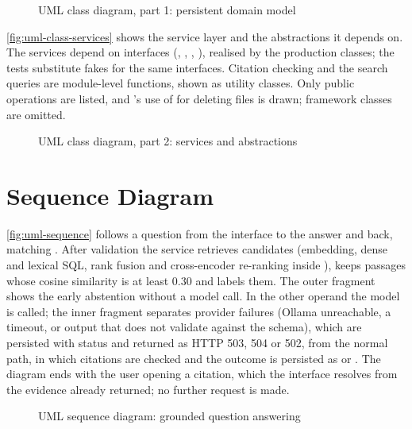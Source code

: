 \begin{figure}[htbp]
  \centering
  \caption{UML class diagram, part 1: persistent domain model}\label{fig:uml-class-domain}
\end{figure}

\autoref{fig:uml-class-services} shows the service layer and the abstractions it depends on. The services depend on
interfaces (, , , ), realised by the
production classes; the tests substitute fakes for the same interfaces. Citation checking and the search queries
are module-level functions, shown as \guillemotleft utility\guillemotright{} classes. Only public operations are listed,
and 's use of  for deleting files is drawn; framework classes are omitted.

\begin{figure}
  \centering
  \caption{UML class diagram, part 2: services and abstractions}\label{fig:uml-class-services}
\end{figure}

\section{Sequence Diagram}

\autoref{fig:uml-sequence} follows a question from the interface to the answer and back, matching
. After validation the service retrieves candidates (embedding, dense and lexical SQL, rank
fusion and cross-encoder re-ranking inside ), keeps passages whose cosine similarity is at least
0.30 and labels them. The outer  fragment shows the early abstention without a model call. In the other
operand the model is called; the inner  fragment separates provider failures (Ollama unreachable, a
timeout, or output that does not validate against the schema), which are persisted with status  and
returned as HTTP 503, 504 or 502, from the normal path, in which citations are checked and the outcome is persisted
as  or . The diagram ends with the user opening a citation, which the
interface resolves from the evidence already returned; no further request is made.

\begin{figure}
  \centering
  \caption{UML sequence diagram: grounded question answering}\label{fig:uml-sequence}
\end{figure}

